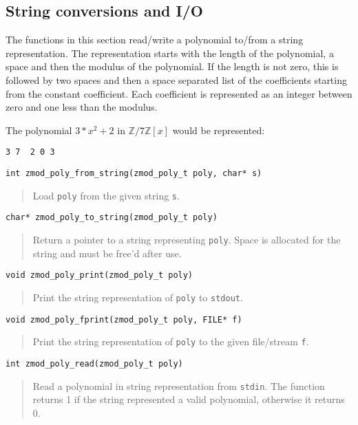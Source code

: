 \documentclass[a4paper,10pt]{article}
\newcommand{\Z}{\mathbb{Z}}
\newcommand{\code}{\lstinline}
\begin{document}
\subsection{String conversions and I/O}
The functions in this section read/write a polynomial to/from a string representation. The representation starts with the length of the polynomial, a space and then the modulus of the polynomial. If the length is not zero, this is followed by two spaces and then a space separated list of the coefficients starting from the constant coefficient. Each coefficient is represented as an integer between zero and one less than the modulus.

The polynomial $3*x^2+2$ in $\Z/7\Z[x]$ would be represented:

\begin{lstlisting}
3 7  2 0 3
\end{lstlisting}

\begin{lstlisting}
int zmod_poly_from_string(zmod_poly_t poly, char* s)
\end{lstlisting}
\begin{quote}
Load \code{poly} from the given string \code{s}.
\end{quote}

\begin{lstlisting}
char* zmod_poly_to_string(zmod_poly_t poly)
\end{lstlisting}
\begin{quote}
Return a pointer to a string representing \code{poly}. Space is allocated for the string and must be free'd after use.
\end{quote}

\begin{lstlisting}
void zmod_poly_print(zmod_poly_t poly)
\end{lstlisting}
\begin{quote}
Print the string representation of \code{poly} to \code{stdout}.
\end{quote}

\begin{lstlisting}
void zmod_poly_fprint(zmod_poly_t poly, FILE* f)
\end{lstlisting}
\begin{quote}
Print the string representation of \code{poly} to the given file/stream \code{f}.
\end{quote}

\begin{lstlisting}
int zmod_poly_read(zmod_poly_t poly)
\end{lstlisting}
\begin{quote}
Read a polynomial in string representation from \code{stdin}. The function returns 1 if the string represented a valid polynomial, otherwise it returns 0.
\end{quote}
\end{document}
